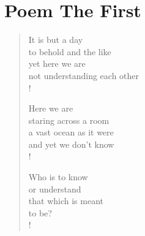 \section{Poem The First}

\settowidth{\versewidth}{Than Tycho Brahe, or Erra Pater:}
\begin{verse}
It is but a day \\
to behold and the like \\
yet here we are \\
not understanding each other \\!

Here we are \\
staring across a room \\
a vast ocean as it were \\
and yet we don't know \\!

Who is to know \\
or understand \\
that which is meant \\
to be? \\!
\end{verse}
